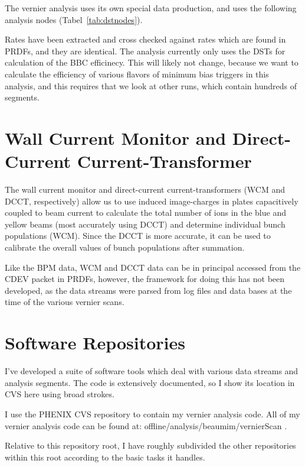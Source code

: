 The vernier analysis uses its own special data production, and uses the
following analysis
nodes (Tabel~\ref{tab:dstnodes}).

Rates have been extracted and cross checked against rates which are found in
PRDFs, and they are identical. The analysis currently only uses the DSTs for
calculation of the BBC efficinecy. This will likely not change, because we want
to calculate the efficiency of various flavors of minimum bias triggers in this
analysis, and this requires that we look at other runs, which contain hundreds
of segments. 



\section{Wall Current Monitor and Direct-Current Current-Transformer}
The wall current monitor and direct-current current-transformers (WCM and DCCT,
respectively) allow us to use induced image-charges in plates capacitively
coupled to beam current to calculate the total number of ions in the blue and
yellow beams (most accurately using DCCT) and determine individual bunch
populations (WCM). Since the DCCT is more accurate, it can be used to calibrate
the overall values of bunch populations after summation.

Like the BPM data, WCM and DCCT data can be in principal accessed from the CDEV
packet in PRDFs, however, the framework for doing this has not been developed,
as the data streams were parsed from log files and data bases at the time of the
various vernier scans.




\section{Software Repositories}
I've developed a suite of software tools which deal with various data streams
and analysis segments. The code is extensively documented, so I show its
location in CVS here using broad strokes.

I use the PHENIX CVS repository to contain my vernier analysis code. All of my
vernier analysis code can be found at: offline/analysis/beaumim/vernierScan .

Relative to this repository root, I have roughly subdivided the other
repositories within this root according to the basic tasks it handles.

